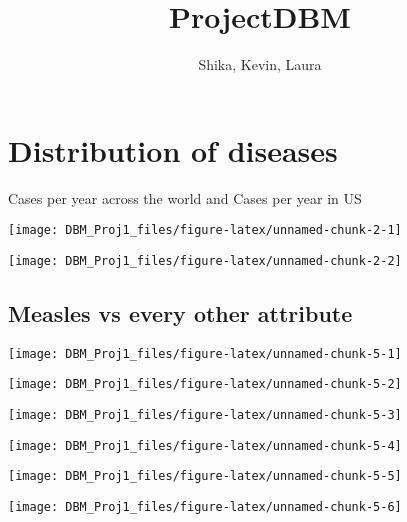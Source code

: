 \documentclass[
]{article}
\title{ProjectDBM}
\author{Shika, Kevin, Laura}
\date{}
\begin{document}
\maketitle

\hypertarget{distribution-of-diseases}{%
\section{Distribution of diseases}\label{distribution-of-diseases}}

Cases per year across the world and Cases per year in US

\begin{center}\texttt{[image: DBM\_Proj1\_files/figure-latex/unnamed-chunk-2-1]} \end{center}

\begin{center}\texttt{[image: DBM\_Proj1\_files/figure-latex/unnamed-chunk-2-2]} \end{center}

\hypertarget{measles-vs-every-other-attribute}{%
\subsection{Measles vs every other
attribute}\label{measles-vs-every-other-attribute}}

\begin{center}\texttt{[image: DBM\_Proj1\_files/figure-latex/unnamed-chunk-5-1]} \end{center}

\begin{center}\texttt{[image: DBM\_Proj1\_files/figure-latex/unnamed-chunk-5-2]} \end{center}

\begin{center}\texttt{[image: DBM\_Proj1\_files/figure-latex/unnamed-chunk-5-3]} \end{center}

\begin{center}\texttt{[image: DBM\_Proj1\_files/figure-latex/unnamed-chunk-5-4]} \end{center}

\begin{center}\texttt{[image: DBM\_Proj1\_files/figure-latex/unnamed-chunk-5-5]} \end{center}

\begin{center}\texttt{[image: DBM\_Proj1\_files/figure-latex/unnamed-chunk-5-6]} \end{center}
\end{document}
